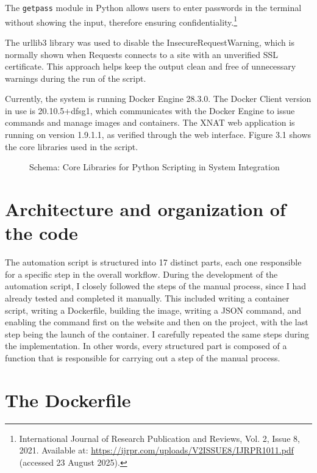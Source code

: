 The \texttt{getpass} module in Python allows users to enter passwords in the terminal without showing the input, therefore ensuring confidentiality.\footnote{International Journal of Research Publication and Reviews, Vol. 2, Issue 8, 2021. Available at: \url{https://ijrpr.com/uploads/V2ISSUE8/IJRPR1011.pdf} (accessed 23 August 2025).}


The urllib3 library was used to disable the InsecureRequestWarning, which is normally shown when Requests connects to a site with an unverified SSL certificate. This approach helps keep the output clean and free of unnecessary warnings during the run of the script.

Currently, the system is running Docker Engine 28.3.0. The Docker Client version in use is 20.10.5+dfsg1, which communicates with the Docker Engine to issue commands and manage images and containers. The XNAT web application is running on version 1.9.1.1, as verified through the web interface. Figure 3.1 shows the core libraries used in the script.


\begin{figure}[ht]
  \centering
  \def\svgwidth{0.8\linewidth}
  
  \caption{Schema: Core Libraries for Python Scripting in System Integration}
  \label{fig:diagram-core-libraries}
\end{figure}






\section{Architecture and organization of the code}
The automation script is structured into 17 distinct parts, each one responsible for a specific step in the overall workflow.
During the development of the automation script, I closely followed the steps of the manual process, since I had already tested and completed it manually. This included writing a container script, writing a Dockerfile, building the image, writing a JSON command, and enabling the command first on the website and then on the project, with the last step being the launch of the container. I carefully repeated the same steps during the implementation. In other words, every structured part is composed of a function that is responsible for carrying out a step of the manual process.
 
 \section{The Dockerfile}
 
